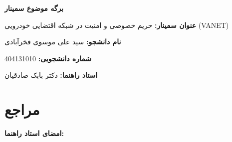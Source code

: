 \documentclass[12pt,a4paper]{article}
\begin{document}
\begin{center}
{\Large \textbf{برگه موضوع سمینار}}\\[1cm]
\end{center}

\noindent\textbf{عنوان سمینار:}
حریم خصوصی و امنیت در شبکه اقتضایی خودرویی (VANET)

\vspace{0.5cm}

\noindent\textbf{نام دانشجو:}
سید علی موسوی فخرآبادی

\vspace{0.5cm}

\noindent\textbf{شماره دانشجویی:}
404131010

\vspace{0.5cm}

\noindent\textbf{استاد راهنما:}
دکتر بابک صادقیان

\vspace{1cm}

\section*{مراجع}
\begin{latin}
\nocite{*}
\printbibliography[heading=none]
\end{latin}

\vspace{1cm}
\noindent\textbf{امضای استاد راهنما:}
\end{document}
